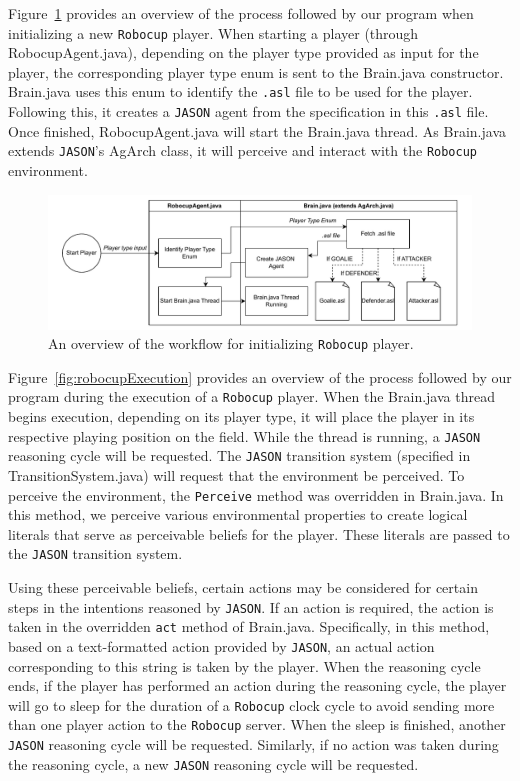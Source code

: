 \documentclass[conference]{IEEEtran}
\begin{document}
Figure~\ref{fig:robocupDesign} provides an overview of the process followed by our program when initializing a new \texttt{Robocup} player.  When starting a player (through RobocupAgent.java), depending on the player type provided as input for the player, the corresponding player type enum is sent to the Brain.java constructor. Brain.java uses this enum to identify the \texttt{.asl} file to be used for the player. Following this, it creates a \texttt{JASON} agent from the specification in this \texttt{.asl} file. Once finished, RobocupAgent.java will start the Brain.java thread. As Brain.java extends \texttt{JASON}'s AgArch class, it will perceive and interact with the \texttt{Robocup} environment. 

\begin{figure}[ht!]
    \centering\centerline{\includegraphics[width=.5\textwidth]{Figures/DesignWorkflow.pdf}}
    \caption{An overview of the workflow for initializing \texttt{Robocup} player.}
    \label{fig:robocupDesign}
\end{figure}

Figure~\ref{fig:robocupExecution} provides an overview of the process followed by our program during the execution of a \texttt{Robocup} player. When the Brain.java thread begins execution, depending on its player type, it will place the player in its respective playing position on the field. While the thread is running, a \texttt{JASON} reasoning cycle will be requested. The \texttt{JASON} transition system (specified in TransitionSystem.java) will request that the environment be perceived. To perceive the environment, the \texttt{Perceive} method was overridden in Brain.java. In this method, we perceive various environmental properties to create logical literals that serve as perceivable beliefs for the player. These literals are passed to the \texttt{JASON} transition system. 

Using these perceivable beliefs, certain actions may be considered for certain steps in the intentions reasoned by \texttt{JASON}. If an action is required, the action is taken in the overridden \texttt{act} method of Brain.java. Specifically, in this method, based on a text-formatted action provided by \texttt{JASON}, an actual action corresponding to this string is taken by the player. When the reasoning cycle ends, if the player has performed an action during the reasoning cycle, the player will go to sleep for the duration of a \texttt{Robocup} clock cycle to avoid sending more than one player action to the \texttt{Robocup} server. When the sleep is finished, another \texttt{JASON} reasoning cycle will be requested. Similarly, if no action was taken during the reasoning cycle, a new \texttt{JASON} reasoning cycle will be requested.
\end{document}
